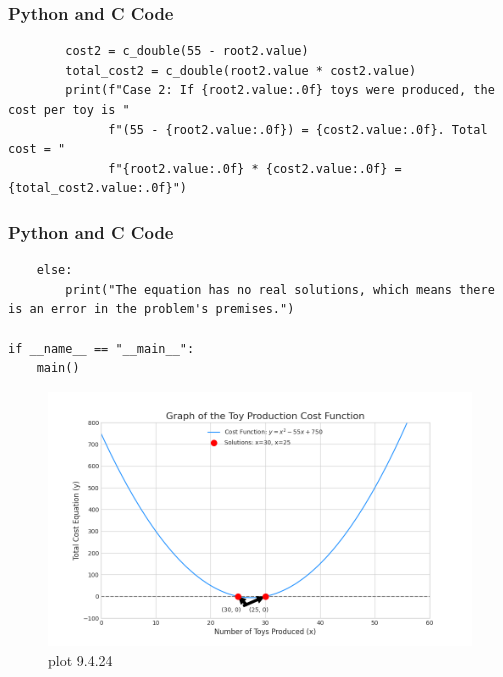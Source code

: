 \documentclass{beamer}
\begin{document}
\begin{frame}[fragile]
\frametitle{Python and C Code}
\begin{lstlisting}
        cost2 = c_double(55 - root2.value)
        total_cost2 = c_double(root2.value * cost2.value)
        print(f"Case 2: If {root2.value:.0f} toys were produced, the cost per toy is "
              f"(55 - {root2.value:.0f}) = {cost2.value:.0f}. Total cost = "
              f"{root2.value:.0f} * {cost2.value:.0f} = {total_cost2.value:.0f}")
\end{lstlisting}
\end{frame}

\begin{frame}[fragile]
\frametitle{Python and C Code}
\begin{lstlisting}
    else:
        print("The equation has no real solutions, which means there is an error in the problem's premises.")

if __name__ == "__main__":
    main()

\end{lstlisting}
\end{frame}
\begin{frame}
    \begin{figure}[H]
        \centering
        \includegraphics[width=0.75\columnwidth]{graph16.png}
        \caption{plot 9.4.24}
        \label{fig:placeholder}
    \end{figure}
\end{frame}
\end{document}
